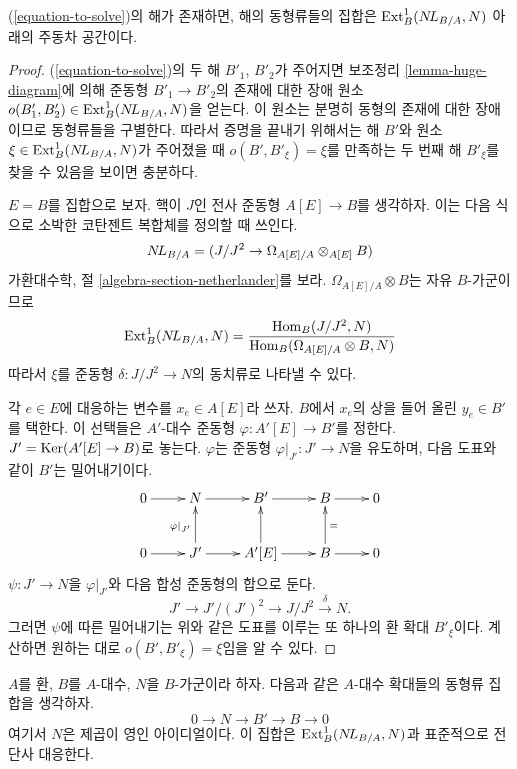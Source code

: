 \begin{lemma}
\label{lemma-choices}
(\ref{equation-to-solve})의 해가 존재하면, 해의 동형류들의 집합은
$\mathop{\mathrm{Ext}}\nolimits^1_B(\mathop{N\!L}\nolimits_{B/A}, N)$ 아래의 주동차 공간이다.
\end{lemma}

\begin{proof}
(\ref{equation-to-solve})의 두 해 $B'_1$, $B'_2$가 주어지면
보조정리 \ref{lemma-huge-diagram}에 의해 준동형 $B'_1\to B'_2$의
존재에 대한 장애 원소
$o(B'_1,B'_2)\in\mathop{\mathrm{Ext}}\nolimits^1_B(\mathop{N\!L}\nolimits_{B/A},N)$을 얻는다. 이 원소는
분명히 동형의 존재에 대한 장애이므로 동형류들을 구별한다. 따라서 증명을
끝내기 위해서는 해 $B'$와 원소 $\xi\in\mathop{\mathrm{Ext}}\nolimits^1_B(\mathop{N\!L}\nolimits_{B/A},N)$가
주어졌을 때
$o(B',B'_\xi)=\xi$를 만족하는 두 번째 해 $B'_\xi$를 찾을 수 있음을
보이면 충분하다.

\medskip\noindent
$E=B$를 집합으로 보자. 핵이 $J$인 전사 준동형 $A[E]\to B$를
생각하자. 이는 다음 식으로 소박한 코탄젠트 복합체를 정의할 때 쓰인다.
$$
\mathop{N\!L}\nolimits_{B/A} = (J/J^2 \to \Omega_{A[E]/A} \otimes_{A[E]} B)
$$
가환대수학, 절 \ref{algebra-section-netherlander}를 보라.
$\Omega_{A[E]/A}\otimes B$는 자유 $B$-가군이므로
$$
\mathop{\mathrm{Ext}}\nolimits^1_B(\mathop{N\!L}\nolimits_{B/A}, N) =
\frac{\mathop{\mathrm{Hom}}\nolimits_B(J/J^2, N)}
{\mathop{\mathrm{Hom}}\nolimits_B(\Omega_{A[E]/A} \otimes B, N)}
$$
따라서 $\xi$를 준동형 $\delta:J/J^2\to N$의 동치류로 나타낼 수 있다.

\medskip\noindent
각 $e\in E$에 대응하는 변수를 $x_e\in A[E]$라 쓰자. $B$에서
$x_e$의 상을 들어 올린 $y_e\in B'$를 택한다. 이 선택들은
$A'$-대수 준동형 $\varphi:A'[E]\to B'$를 정한다.
$J'=\mathop{\mathrm{Ker}}(A'[E]\to B)$로 놓는다. $\varphi$는 준동형
$\varphi|_{J'}:J'\to N$을 유도하며, 다음 도표와 같이 $B'$는
밀어내기이다.
$$
\xymatrix{
0 \ar[r] & N \ar[r] & B' \ar[r] & B \ar[r] & 0 \\
0 \ar[r] & J' \ar[u]^{\varphi|_{J'}} \ar[r] & A'[E] \ar[u] \ar[r] &
B \ar[u]_{=} \ar[r] & 0
}
$$
$\psi:J'\to N$을 $\varphi|_{J'}$와 다음 합성 준동형의 합으로 둔다.
$$
J' \to J'/(J')^2 \to J/J^2 \xrightarrow{\delta} N.
$$
그러면 $\psi$에 따른 밀어내기는 위와 같은 도표를 이루는 또 하나의
환 확대 $B'_\xi$이다. 계산하면 원하는 대로
$o(B',B'_\xi)=\xi$임을 알 수 있다.
\end{proof}

\begin{lemma}
\label{lemma-extensions-of-algebras}
$A$를 환, $B$를 $A$-대수, $N$을 $B$-가군이라 하자. 다음과 같은
$A$-대수 확대들의 동형류 집합을 생각하자.
$$
0 \to N \to B' \to B \to 0
$$
여기서 $N$은 제곱이 영인 아이디얼이다. 이 집합은
$\mathop{\mathrm{Ext}}\nolimits^1_B(\mathop{N\!L}\nolimits_{B/A},N)$과 표준적으로 전단사 대응한다.
\end{lemma}

